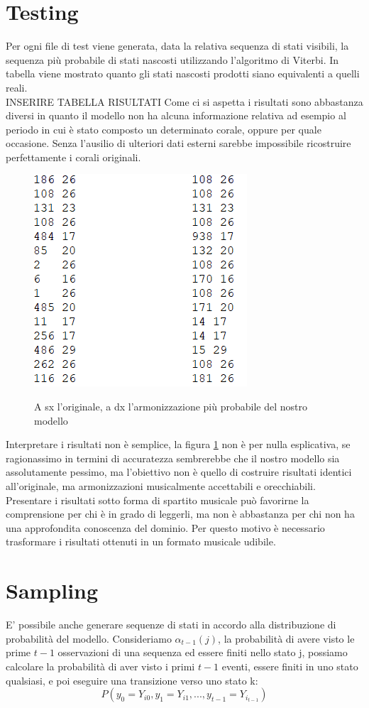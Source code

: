 \section{Testing}
Per ogni file di test viene generata, data la relativa sequenza di stati visibili, la sequenza più probabile di stati nascosti utilizzando l'algoritmo di Viterbi.
In tabella viene mostrato quanto gli stati nascosti prodotti siano equivalenti a quelli reali. \\
INSERIRE TABELLA RISULTATI
Come ci si aspetta i risultati sono abbastanza diversi in quanto il modello non ha alcuna informazione relativa ad esempio al periodo in cui è stato composto un determinato corale, oppure per quale occasione. Senza l'ausilio di ulteriori dati esterni sarebbe impossibile ricostruire perfettamente i corali originali.
\begin{figure}[H]
	\centering
	\caption{A sx l'originale, a dx l'armonizzazione più probabile del nostro modello}
	\includegraphics{figures/viterbi.png}
	\label{viterbi}
\end{figure}
\noindent
Interpretare i risultati non è semplice, la figura \ref{viterbi} non è per nulla esplicativa, se ragionassimo in termini di accuratezza sembrerebbe che il nostro modello sia assolutamente pessimo, ma l'obiettivo non è quello di costruire risultati identici all'originale, ma armonizzazioni musicalmente accettabili e orecchiabili. \\
Presentare i risultati sotto forma di spartito musicale può favorirne la comprensione per chi è in grado di leggerli, ma non è abbastanza per chi non ha una approfondita conoscenza del dominio. Per questo motivo è necessario trasformare i risultati ottenuti in un formato musicale udibile.
\section{Sampling}
E' possibile anche generare sequenze di stati in accordo alla distribuzione di probabilità del modello. Consideriamo $\alpha_{t-1}(j)$, la probabilità di avere visto le prime $t - 1$ osservazioni di una sequenza ed essere finiti nello stato j, possiamo calcolare la probabilità di aver visto i primi $t - 1$ eventi, essere finiti in uno stato qualsiasi, e poi eseguire una transizione verso uno stato k:
\begin{equation}
P(y_0 = Y_{i0}, y_1 = Y_{i1}, ...,y_{t-1}=Y_i_{t-1})
\end{equation}
